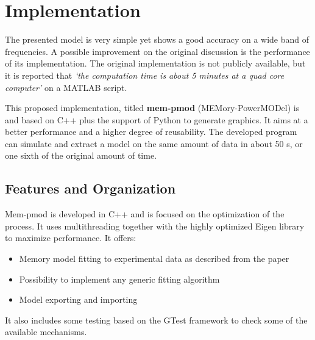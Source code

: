 \section{Implementation}
The presented model is very simple yet shows a good accuracy on a wide band of frequencies. A possible improvement on the original discussion is the performance of its implementation. The original implementation is not publicly available, but it is reported that \textit{`the computation time is about 5 minutes at a quad core computer'}\cite{Hao-HsiangChuang2010ABCP} on a MATLAB script\autocite{5451081}.

This proposed implementation, titled \textbf{mem-pmod} (MEMory-PowerMODel) is  and based on C++ plus the support of Python to generate graphics. It aims at a better performance and a higher degree of reusability. The developed program can simulate and extract a model on the same amount of data in about 50 s, or one sixth of the original amount of time.

\subsection{Features and Organization}
Mem-pmod is developed in C++ and is focused on the optimization of the process. It uses multithreading together with the highly optimized Eigen library to maximize performance. It offers:
\begin{itemize}
    \item Memory model fitting to experimental data as described from the paper
    \item Possibility to implement any generic fitting algorithm
    \item Model exporting and importing
\end{itemize}
It also includes some testing based on the GTest framework to check some of the available mechanisms.

